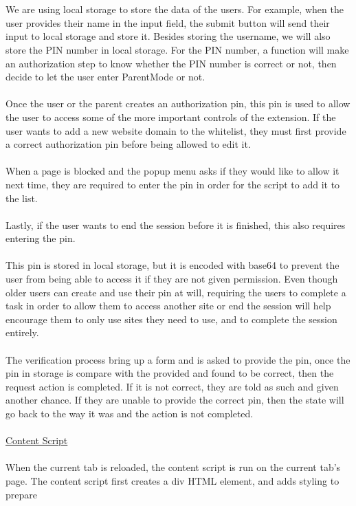 \documentclass[12pt]{article}
\begin{document}
\\\\
We are using local storage to store the data of the users. For example, when the user provides their name in the input field, the submit button will send their input to local storage and store it. Besides storing the username, we will also store the PIN number in local storage. For the PIN number, a function will make an authorization step to know whether the PIN number is correct or not, then decide to let the user enter ParentMode or not.
\\\\
\indent Once the user or the parent creates an authorization pin, this pin is used to allow the user to access some of the more important controls of the extension. If the user wants to add a new website domain to 
the whitelist, they must first provide a correct authorization pin before being allowed to edit it. 
\\\\\indent When a page is blocked and the popup menu asks if they would like to allow it next time, they are required to enter the 
pin in order for the script to add it to the list. 
\\\\\indent Lastly, if the user wants to end the session before it is finished, this also requires entering the pin. 
\\\\\indent This pin is stored in local storage, but it is encoded with base64 to prevent the user from being able to access it if they are 
not given permission. Even though older users can create and use their pin at will, requiring the users to complete a task in order to allow them to access another site 
or end the session will help encourage them to only use sites they need to use, and to complete the session entirely. 
\\\\\indent The verification process bring up a form and is asked to provide the pin, once the pin in storage is compare with the provided and found to be correct, then the request action is completed. If it is not correct, 
they are told as such and given another chance. If they are unable to provide the correct pin, then the state will go back to the way it was and the action is not completed. 
\\\\
\noindent
\underline{Content Script}\\\\
\indent When the current tab is reloaded, the content script is run on the current tab's page. The content script first creates a div HTML element, and adds styling to prepare
\end{document}
